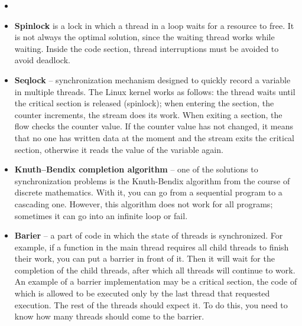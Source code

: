 {\begin{itemize}
			\item{}
			\item\textbf{Spinlock} is a  lock in which a thread in a loop waits for a resource to free. It is not always the optimal solution, since the waiting thread works while waiting. Inside the code section, thread interruptions must be avoided to avoid deadlock.
			\item\textbf{Seqlock} – synchronization mechanism designed to quickly record a variable in multiple threads. The Linux kernel works as follows: the thread waits until the critical section is released (spinlock); when entering the section, the counter increments, the stream does its work. When exiting a section, the flow checks the counter value. If the counter value has not changed, it means that no one has written data at the moment and the stream exits the critical section, otherwise it reads the value of the variable again.
			\item\textbf{Knuth–Bendix completion algorithm} – one of the solutions to synchronization problems is the Knuth-Bendix algorithm from the course of discrete mathematics. With it, you can go from a sequential program to a cascading one. However, this algorithm does not work for all programs; sometimes it can go into an infinite loop or fail.
			\item\textbf{Barier} – a part of code in which the state of threads is synchronized. For example, if a function in the main thread requires all child threads to finish their work, you can put a barrier in front of it. Then it will wait for the completion of the child threads, after which all threads will continue to work. An example of a barrier implementation may be a critical section, the code of which is allowed to be executed only by the last thread that requested execution. The rest of the threads should expect it. To do this, you need to know how many threads should come to the barrier.

\end{itemize}}
